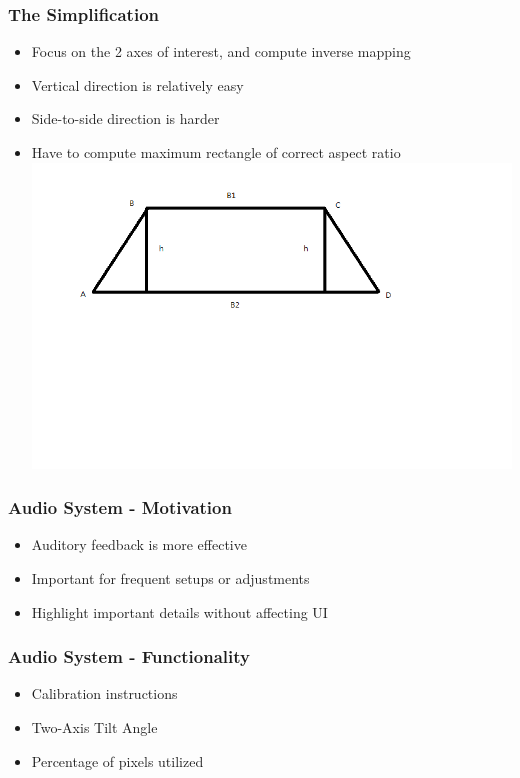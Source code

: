 \documentclass{beamer}
\begin{document}
\begin{frame}
\frametitle{The Simplification}
\begin{itemize}
\item Focus on the 2 axes of interest, and compute inverse mapping
\item Vertical direction is relatively easy
\item Side-to-side direction is harder
\pause
\item Have to compute maximum rectangle of correct aspect ratio
\includegraphics[height=0.7\textheight]{./img/rectangle_in_trapezoid.png}
\end{itemize}
\end{frame}

\begin{frame}
\frametitle{Audio System - Motivation}
\begin{itemize}
\item Auditory feedback is more effective
\item Important for frequent setups or adjustments
\item Highlight important details without affecting UI
\end{itemize}
\end{frame}

\begin{frame}
\frametitle{Audio System - Functionality}
\begin{itemize}
\item Calibration instructions
\item Two-Axis Tilt Angle
\item Percentage of pixels utilized
\end{itemize}
\end{frame}
\end{document}
